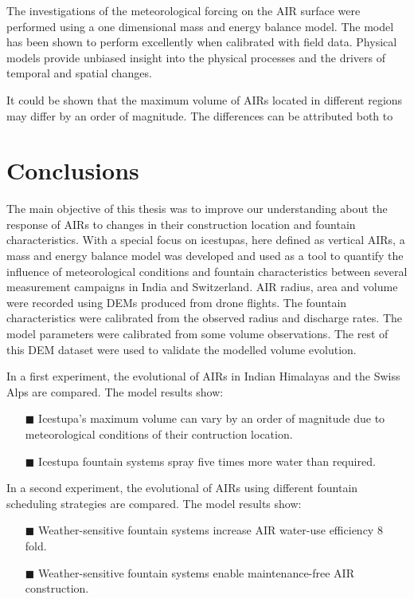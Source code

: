 The investigations of the meteorological forcing on the AIR surface were performed using a one dimensional mass
and energy balance model. The model has been shown to perform excellently when calibrated with field data.
Physical models provide unbiased insight into the physical processes and the drivers of temporal and spatial
changes.

It could be shown that the maximum volume of AIRs located in different regions may differ by an order of
magnitude. The differences can be attributed both to 

\section{Conclusions}

The main objective of this thesis was to improve our understanding about the response of AIRs to changes in
their construction location and fountain characteristics. With a special focus on icestupas, here defined as
vertical AIRs, a mass and energy balance model was developed and used as a tool to quantify the influence of
meteorological conditions and fountain characteristics between several measurement campaigns in India and
Switzerland. AIR radius, area and volume were recorded using DEMs produced from drone flights. The fountain
characteristics were calibrated from the observed radius and discharge rates. The model parameters were
calibrated from some volume observations. The rest of this DEM dataset were used to validate the modelled volume
evolution.

In a first experiment, the evolutional of AIRs in Indian Himalayas and the Swiss Alps are compared. The model
results show: 

\begin{itemize} 

\item[\tiny{$\blacksquare$}] Icestupa's maximum volume can vary by an order of magnitude due to meteorological
  conditions of their contruction location. 

\item[\tiny{$\blacksquare$}] Icestupa fountain systems spray five times more water than required.

\end{itemize}

In a second experiment, the evolutional of AIRs using different fountain scheduling strategies are compared. The
model results show: 

\begin{itemize} 

\item[\tiny{$\blacksquare$}] Weather-sensitive fountain systems increase AIR water-use efficiency 8 fold.

\item[\tiny{$\blacksquare$}] Weather-sensitive fountain systems enable maintenance-free AIR construction.


\end{itemize}

